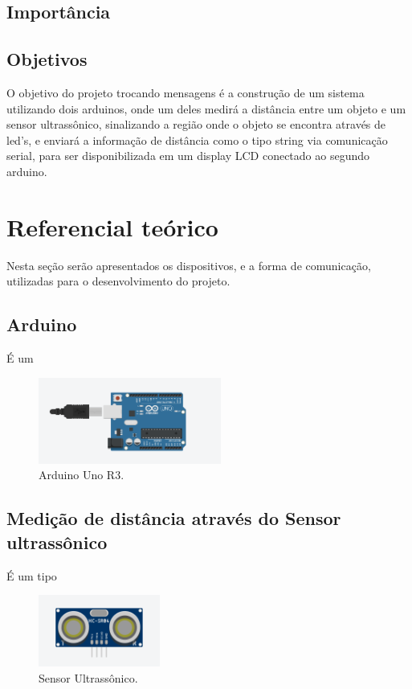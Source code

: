 \documentclass[conference]{IEEEtran}
\begin{document}
\subsection{Importância}

\subsection{Objetivos}
O objetivo do projeto trocando mensagens é a construção de um sistema utilizando dois arduinos,
onde um deles medirá a distância entre um objeto e um sensor ultrassônico, sinalizando a região onde o objeto se encontra através de led's,
e enviará a informação de distância como o tipo string via comunicação serial, para ser disponibilizada em um display LCD conectado ao segundo arduino.

\section{Referencial teórico}
Nesta seção serão apresentados os dispositivos, e a forma de comunicação, utilizadas para o desenvolvimento do projeto.

\subsection{Arduino}
É um \cite{cavalcante2011}

\begin{figure}[htbp]
    \centerline{
        \includegraphics[width=6cm]{images/arduino.png}
    }
    \caption{Arduino Uno R3.}
    \label{fig}
\end{figure}

\subsection{Medição de distância através do Sensor ultrassônico}

É um tipo

\begin{figure}[htbp]
    \centerline{
        \includegraphics[width=4cm]{images/sensor-ultrassonico.png}
    }
    \caption{Sensor Ultrassônico.}
    \label{fig}
\end{figure}
\end{document}
